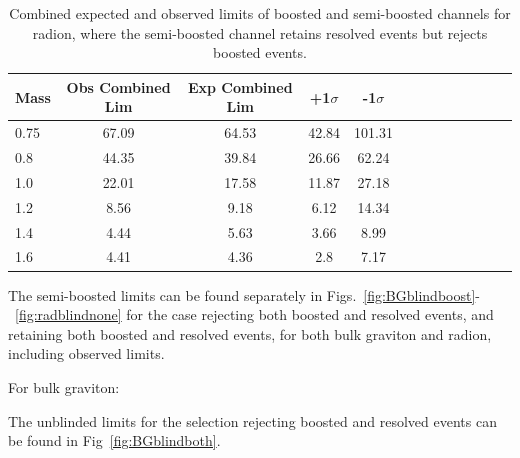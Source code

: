 \begin{table}[h]
\begin{tabular}{|l|c|c|c|c|c|c|c|c|c|c|c|c|}
\hline
Mass &Obs Combined Lim & Exp Combined Lim & +1$\sigma$ & -1$\sigma$\\ \hline
0.75 & 67.09 & 64.53 & 42.84 & 101.31\\
0.8 & 44.35 & 39.84 & 26.66 & 62.24\\
1.0 & 22.01 & 17.58 & 11.87 & 27.18\\
1.2 & 8.56 & 9.18 & 6.12 & 14.34\\
1.4 & 4.44 & 5.63 & 3.66 & 8.99\\
1.6 & 4.41 & 4.36 & 2.8 & 7.17\\
\hline
\end{tabular}
\caption{Combined expected and observed limits of boosted and semi-boosted channels for radion, where the semi-boosted channel retains resolved events but rejects boosted events.}
\label{tab:1p12p1Rad}
\end{table}

The semi-boosted limits can be found separately in Figs.~\ref{fig:BGblindboost}-~\ref{fig:radblindnone} for the case rejecting both boosted and resolved events, and retaining both boosted and resolved events, for both bulk graviton and radion, including observed limits.

For bulk graviton:
 
The unblinded limits for the selection rejecting boosted and resolved events can be found in Fig~\ref{fig:BGblindboth}.

